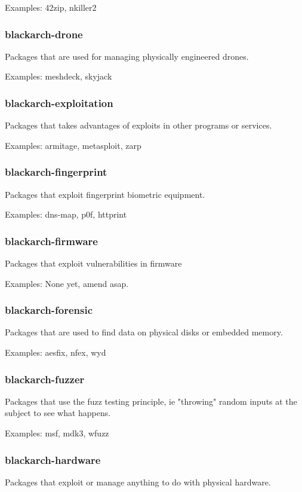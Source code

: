 \documentclass[a4paper, oneside, 11pt]{book}
\begin{document}
Examples: 42zip, nkiller2

\subsubsection{blackarch-drone}
Packages that are used for managing physically engineered
drones.

Examples: meshdeck, skyjack

\subsubsection{blackarch-exploitation}
Packages that takes advantages of exploits in other programs or services.

Examples: armitage, metasploit, zarp

\subsubsection{blackarch-fingerprint}
Packages that exploit fingerprint biometric equipment.

Examples: dns-map, p0f, httprint

\subsubsection{blackarch-firmware}
Packages that exploit vulnerabilities in firmware

Examples: None yet, amend asap.

\subsubsection{blackarch-forensic}
Packages that are used to find data on physical disks or embedded memory.

Examples: aesfix, nfex, wyd

\subsubsection{blackarch-fuzzer}
Packages that use the fuzz testing principle, ie
"throwing" random inputs at the subject to see what happens.

Examples: msf, mdk3, wfuzz

\subsubsection{blackarch-hardware}
Packages that exploit or manage anything to do with
physical hardware.
\end{document}
